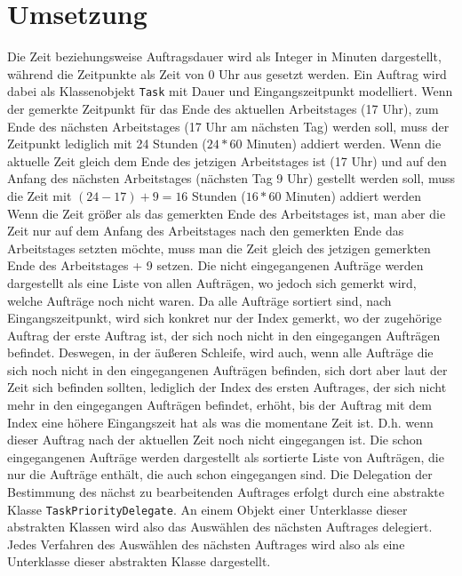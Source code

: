 \documentclass[a4paper,10pt,ngerman]{scrartcl}
\begin{document}
\section{Umsetzung}\label{sec:umsetzung}
	Die Zeit beziehungsweise Auftragsdauer wird als Integer in Minuten dargestellt,
	 während die Zeitpunkte als Zeit von 0 Uhr aus gesetzt werden.
	Ein Auftrag wird dabei als Klassenobjekt \texttt{Task} mit Dauer und Eingangszeitpunkt modelliert.
	Wenn der gemerkte Zeitpunkt für das Ende des aktuellen Arbeitstages (17 Uhr),
	zum Ende des nächsten Arbeitstages (17 Uhr am nächsten Tag)  werden soll,
	muss der Zeitpunkt lediglich mit 24 Stunden ($24 * 60$ Minuten) addiert werden.
	Wenn die aktuelle Zeit gleich dem Ende des jetzigen Arbeitstages ist (17 Uhr)
	und auf den Anfang des nächsten Arbeitstages (nächsten Tag 9 Uhr) gestellt werden soll,
	muss die Zeit mit $(24 - 17) + 9 = 16$ Stunden ($16 * 60$ Minuten) addiert werden 
	Wenn die Zeit größer als das gemerkten Ende des Arbeitstages ist,
	man aber die Zeit nur auf dem Anfang des Arbeitstages nach den gemerkten Ende das Arbeitstages setzten möchte,
	muss man die Zeit gleich des jetzigen gemerkten Ende des Arbeitstages + 9 setzen.
	Die nicht eingegangenen Aufträge werden dargestellt als eine Liste von allen Aufträgen,
	      wo jedoch sich gemerkt wird, welche Aufträge noch nicht waren.
	      Da alle Aufträge sortiert sind, nach Eingangszeitpunkt, wird sich konkret nur der Index gemerkt,
	      wo der zugehörige Auftrag der erste Auftrag ist, der sich noch nicht in den eingegangen Aufträgen befindet.
	Deswegen, in der äußeren Schleife, wird auch, wenn alle Aufträge die sich noch nicht
	      in den eingegangenen Aufträgen befinden, sich dort aber laut der Zeit sich befinden sollten,
	      lediglich der Index des ersten Auftrages, der sich nicht mehr in den eingegangen Aufträgen befindet,
	      erhöht, bis der Auftrag mit dem Index eine höhere Eingangszeit hat als was die momentane Zeit ist.
	      D.h. wenn dieser Auftrag nach der aktuellen Zeit noch nicht eingegangen ist.
	Die schon eingegangenen Aufträge werden dargestellt als sortierte Liste von Aufträgen,
	      die nur die Aufträge enthält, die auch schon eingegangen sind.
	Die Delegation der Bestimmung des nächst zu bearbeitenden Auftrages erfolgt
	      durch eine abstrakte Klasse \texttt{TaskPriorityDelegate}.
	      An einem Objekt einer Unterklasse dieser abstrakten Klassen wird
	      also das Auswählen des nächsten Auftrages delegiert.
	      Jedes Verfahren des Auswählen des nächsten Auftrages wird
	      also als eine Unterklasse dieser abstrakten Klasse dargestellt.
\end{document}
